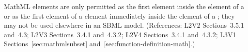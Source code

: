 MathML  elements are only permitted as the first element
inside the  element of a \FunctionDefinition or as the
first element of a  element immediately inside the
 element of a \FunctionDefinition; they may not be used
elsewhere in an SBML model.  (References: L2V2 Sections~3.5.1 and~4.3;
L2V3 Sections~3.4.1 and~4.3.2; L2V4 Sections~3.4.1 and~4.3.2;
L3V1 Sections~\ref{sec:mathmlsubset} and~\ref{sec:function-definition-math}.)

